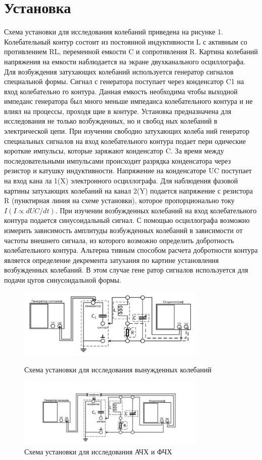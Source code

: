 \documentclass[a4paper, 12pt]{article}
\begin{document}
\section{Установка}
Схема установки для исследования колебаний приведена на рисунке 1.
Колебательный контур состоит из постоянной индуктивности L с активным со
противлением RL, переменной емкости C и сопротивления R. Картина колебаний
напряжения на емкости наблюдается на экране двухканального осциллографа. Для
возбуждения затухающих колебаний используется генератор сигналов специальной
формы. Сигнал с генератора поступает через конденсатор C1 на вход колебательно
го контура. Данная емкость необходима чтобы выходной импеданс генератора был
много меньше импеданса колебательного контура и не влиял на процессы, проходя
щие в контуре.
Установка предназначена для исследования не только возбужденных, но и свобод
ных колебаний в электрической цепи. При изучении свободно затухающих колеба
ний генератор специальных сигналов на вход колебательного контура подает пери
одические короткие импульсы, которые заряжают конденсатор C. За время между
последовательными импульсами происходит разрядка конденсатора через резистор
и катушку индуктивности. Напряжение на конденсаторе UC поступает на вход кана
ла 1(X) электронного осциллографа. Для наблюдения фазовой картины затухающих
колебаний на канал 2(Y) подается напряжение с резистора R (пунктирная линия на
схеме установки), которое пропорционально току $I (I \varpropto  dUC /dt)$.
При изучении возбужденных колебаний на вход колебательного контура подается
синусоидальный сигнал. С помощью осциллографа возможно измерить зависимость
амплитуды возбужденных колебаний в зависимости от частоты внешнего сигнала,
из которого возможно определить добротность колебательного контура. Альтерна
тивным способом расчета добротности контура является определение декремента
затухания по картине установления возбужденных колебаний. В этом случае гене
ратор сигналов используется для подачи цугов синусоидальной формы.


\begin{figure}[h!]
    \centering
    \includegraphics[width=90mm]{./imgs/main_setup.png}
    \caption{Схема установки для исследования вынужденных колебаний}
    \includegraphics[width=90mm]{./imgs/achh_setup.png}
    \caption{Схема установки для исследования АЧХ и ФЧХ}

\end{figure}
\end{document}
